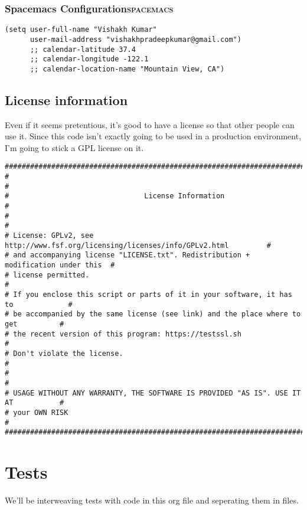 \documentclass[11pt]{article}
\begin{document}
\subsubsection{Spacemacs Configuration\hfill{}\textsc{spacemacs}}
\label{sec:orgf6448d4}
\begin{verbatim}
(setq user-full-name "Vishakh Kumar"
      user-mail-address "vishakhpradeepkumar@gmail.com")
      ;; calendar-latitude 37.4
      ;; calendar-longitude -122.1
      ;; calendar-location-name "Mountain View, CA")
\end{verbatim}

\subsection{License information}
\label{sec:org0e9c56c}
Even if it seems pretentious, it's good to have a license so that other people can use it. Since this code isn't exactly going to be used in a production environment, I'm going to stick a GPL license on it.

\begin{verbatim}
#####################################################################################
#                                                                                   #
#                                License Information                                #
#                                                                                   #
# License: GPLv2, see http://www.fsf.org/licensing/licenses/info/GPLv2.html         #
# and accompanying license "LICENSE.txt". Redistribution + modification under this  #
# license permitted.                                                                #
# If you enclose this script or parts of it in your software, it has to             #
# be accompanied by the same license (see link) and the place where to get          #
# the recent version of this program: https://testssl.sh                            #
# Don't violate the license.                                                        #
#                                                                                   #
# USAGE WITHOUT ANY WARRANTY, THE SOFTWARE IS PROVIDED "AS IS". USE IT AT           #
# your OWN RISK                                                                     #
#####################################################################################
\end{verbatim}

\section{Tests}
\label{sec:org9dbd8df}
We'll be interweaving tests with code in this org file and seperating them in files. 
\end{document}
